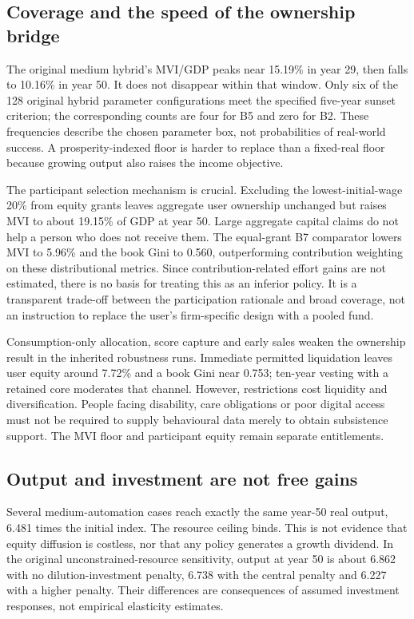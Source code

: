 \subsection{Coverage and the speed of the ownership bridge}
The original medium hybrid's MVI/GDP peaks near 15.19\% in year 29, then falls to 10.16\% in year 50. It does not disappear within that window. Only six of the 128 original hybrid parameter configurations meet the specified five-year sunset criterion; the corresponding counts are four for B5 and zero for B2. These frequencies describe the chosen parameter box, not probabilities of real-world success. A prosperity-indexed floor is harder to replace than a fixed-real floor because growing output also raises the income objective.

The participant selection mechanism is crucial. Excluding the lowest-initial-wage 20\% from equity grants leaves aggregate user ownership unchanged but raises MVI to about 19.15\% of GDP at year 50. Large aggregate capital claims do not help a person who does not receive them. The equal-grant B7 comparator lowers MVI to 5.96\% and the book Gini to 0.560, outperforming contribution weighting on these distributional metrics. Since contribution-related effort gains are not estimated, there is no basis for treating this as an inferior policy. It is a transparent trade-off between the participation rationale and broad coverage, not an instruction to replace the user's firm-specific design with a pooled fund.

Consumption-only allocation, score capture and early sales weaken the ownership result in the inherited robustness runs. Immediate permitted liquidation leaves user equity around 7.72\% and a book Gini near 0.753; ten-year vesting with a retained core moderates that channel. However, restrictions cost liquidity and diversification. People facing disability, care obligations or poor digital access must not be required to supply behavioural data merely to obtain subsistence support. The MVI floor and participant equity remain separate entitlements.

\subsection{Output and investment are not free gains}
Several medium-automation cases reach exactly the same year-50 real output, 6.481 times the initial index. The resource ceiling binds. This is not evidence that equity diffusion is costless, nor that any policy generates a growth dividend. In the original unconstrained-resource sensitivity, output at year 50 is about 6.862 with no dilution-investment penalty, 6.738 with the central penalty and 6.227 with a higher penalty. Their differences are consequences of assumed investment responses, not empirical elasticity estimates.

